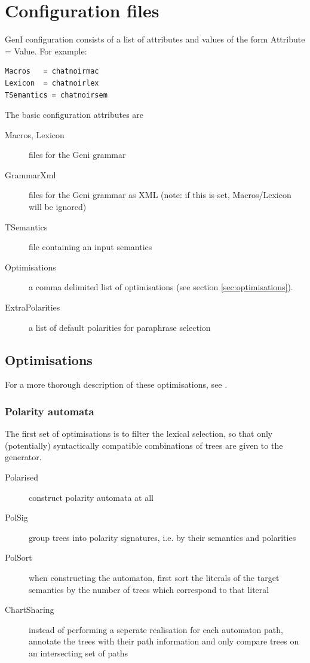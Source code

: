 \documentclass[11pt]{article}
\begin{document}
\section{Configuration files}
\label{sec:configuration_files}

GenI configuration consists of a list of
attributes and values of the form Attribute = Value.  For example: 

\begin{verbatim}
Macros   = chatnoirmac
Lexicon  = chatnoirlex
TSemantics = chatnoirsem
\end{verbatim}

The basic configuration attributes are

\begin{description}
\item[Macros, Lexicon] files for the Geni grammar
\item[GrammarXml]      files for the Geni grammar as XML (note: if this
                       is set, Macros/Lexicon will be ignored)
\item[TSemantics]      file containing an input semantics
\item[Optimisations]   a comma delimited list of optimisations (see
                       section \ref{sec:optimisations}).
\item[ExtraPolarities] a list of default polarities for paraphrase selection   
\end{description}

\subsection{Optimisations}

For a more thorough description of these optimisations, see
\cite{kow2003}.

\subsubsection{Polarity automata}

The first set of optimisations is to filter the lexical selection,
so that only (potentially) syntactically compatible combinations
of trees are given to the generator.  

\begin{description}
\item[Polarised] construct polarity automata at all
\item[PolSig]    group trees into polarity signatures, i.e. by their
                 semantics and polarities
\item[PolSort]   when constructing the automaton, first sort the
                 literals of the target semantics by the number
                 of trees which correspond to that literal
\item[ChartSharing] instead of performing a seperate realisation
                    for each automaton path, annotate the trees
                    with their path information and only compare
                    trees on an intersecting set of paths
\end{description}
\end{document}
